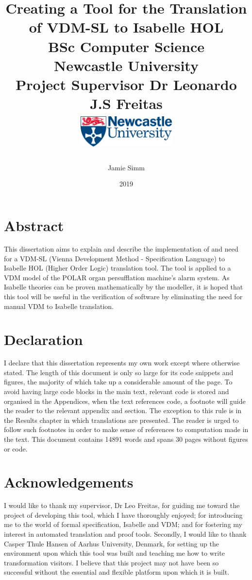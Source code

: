 \documentclass[11pt]{report}
\title{
{Creating a Tool for the Translation of VDM-SL to Isabelle HOL}\\
{\vspace{0.5cm}}
{\large BSc Computer Science}\\
{\vspace{0.5cm}}
{\large Newcastle University}\\
{\vspace{0.5cm}}
{\large Project Supervisor Dr Leonardo J.S Freitas}\\
{\vspace{2.5cm}}
{\includegraphics[width=5cm, height=2cm ]{newcastle.jpg}}
}
\author{Jamie Simm}
\date{2019}
\begin{document}
\maketitle

\chapter*{Abstract}
This dissertation aims to explain and describe the implementation of and need for a VDM-SL (Vienna Development Method - Specification Language) to Isabelle HOL (Higher Order Logic) translation tool. The tool is applied to a VDM model of the POLAR organ persufflation machine's alarm system. As Isabelle theories can be proven mathematically by the modeller, it is hoped that this tool will be useful in the verification of software by eliminating the need for manual VDM to Isabelle translation.
\chapter*{Declaration}
I declare that this dissertation represents my own work except where otherwise stated. The length of this document is only so large for its code snippets and figures, the majority of which take up a considerable amount of the page. To avoid having large code blocks in the main text, relevant code is stored and organised in the Appendices, when the text references code, a footnote will guide the reader to the relevant appendix and section. The exception to this rule is in the Results chapter in which translations are presented. The reader is urged to follow such footnotes in order to make sense of references to computation made in the text. This document contains 14891 words and spans 30 pages without figures or code.

\chapter*{Acknowledgements}
I would like to thank my supervisor, Dr Leo Freitas, for guiding me toward the project of developing this tool, which I have thoroughly enjoyed; for introducing me to the world of formal specification, Isabelle and VDM; and for fostering my interest in automated translation and proof tools. Secondly, I would like to thank Casper Thule Hansen of Aarhus University, Denmark, for setting up the environment upon which this tool was built and teaching me how to write transformation visitors. I believe that this project may not have been so successful without the essential and flexible platform upon which it is built. 
\end{document}
